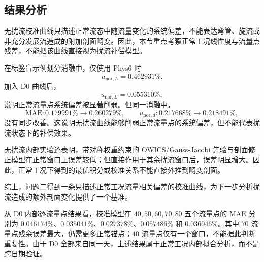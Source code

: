 \subsection{结果分析}

无扰流校准曲线只描述正常流态中随流量变化的系统偏差，不能表达弯管、旋流或非充分发展流造成的附加剖面畸变。因此，本节重点考察正常工况线性度与流量点残差，不能把该曲线直接视为扰流补偿模型。

在标签盲示例划分消融中，仅使用 Phys6 时
\begin{equation}
u_{\mathrm{nor},L}=0.462931\% .
\end{equation}
加入 D0 曲线后，
\begin{equation}
u_{\mathrm{nor},L}=0.055310\% ,
\end{equation}
说明正常流量点系统偏差被显著削弱。但同一消融中，
\begin{equation}
\mathrm{MAE}:0.179991\%\rightarrow 0.260279\%,
\qquad
u_{\mathrm{nor},d}:0.217668\%\rightarrow 0.218491\%,
\end{equation}
没有同步改善。这说明无扰流曲线能够削弱正常流量点的系统偏差，但不能代表扰流状态下的补偿效果。

无扰流内部实验还表明，带对称权重约束的 OWICS/Gauss-Jacobi 先验与剖面修正模型在正常窗口上误差较低；但直接作用于其余扰流窗口后，误差明显增大。因此，正常工况下得到的最优积分或校准关系不能直接外推到畸变剖面。

综上，问题二得到一条只描述正常工况流量相关偏差的校准曲线，为下一步分析扰流造成的额外剖面变化提供了一个基准。

从 D0 内部逐流量点结果看，校准模型在 $40,50,60,70,80$ 五个流量点的 MAE 分别为 $0.046174\%$、$0.035041\%$、$0.027378\%$、$0.057486\%$ 和 $0.036046\%$。其中 $70$ 流量点残余误差最大，仍需更多正常锚点；$40$ 流量点仅有一个窗口，不能据此判断重复性。由于 D0 全部来自同一天，上述结果属于正常工况内部拟合分析，而不是跨日期验证。
